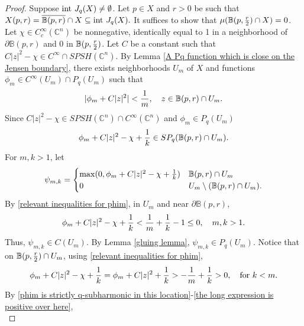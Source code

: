 \documentclass[12pt]{amsart}
\numberwithin{equation}{section}
{\theoremstyle{definition}
\newtheorem{remark}[theorem]{Remark}
}
\begin{document}
\begin{proof}
Suppose $\hbox{int } J_q(X) \neq \emptyset$. Let $p \in X$ and $r > 0$ be such that
$
X(p, r) = \overline{\mathbb{B}(p, r)} \cap X \subseteq \hbox{int } J_q(X).
$
It suffices to show that $\mu(\mathbb{B}(p, {r \over 2}) \cap X) = 0$.  Let $\chi \in C_c^{\infty}(\mathbb{C}^n)$ be nonnegative, identically equal to 1 in a neighborhood of $\partial \mathbb{B}(p, r)$ and 0 in $\mathbb{B}(p, {r \over 2})$.  Let $C$ be a constant such that $C|z|^2 - \chi \in C^{\infty} \cap SPSH(\mathbb{C}^n)$.  By Lemma \ref{A Pq function which is close on the Jensen boundary}, there exists neighborhoods $U_m$ of $X$ and functions $\phi_m \in C^{\infty}(U_m) \cap P_q(U_m)$ such that
\begin{equation}\label{relevant inequalities for phim}
    |\phi_m + C|z|^2| < {1 \over m}, \quad z \in \mathbb{B}(p, r) \cap U_m.
\end{equation}
Since $C|z|^2 - \chi \in SPSH(\mathbb{C}^n) \cap C^\infty(\mathbb{C}^n)$ and $\phi_m \in P_q(U_m)$ 
\begin{equation}\label{phim is strictly q-subharmonic in this location}
    \phi_m + C|z|^2 - \chi + {1 \over k} \in SP_q(\mathbb{B}(p, r) \cap U_m).
\end{equation}
For $m, k > 1$, let 
\begin{equation}\label{definition of psimk}
\psi_{m, k} = \begin{cases}
    \max(0, \phi_m + C|z|^2 - \chi + {1 \over k}) & \mathbb{B}(p, r) \cap U_m
    \\
    0 & U_m \setminus (\mathbb{B}(p, r) \cap U_m).
    \end{cases}
\end{equation}
By \eqref{relevant inequalities for phim}, in $U_m$ and near $\partial \mathbb{B}(p, r)$,
$$
\phi_m + C|z|^2 - \chi + {1 \over k} < {1 \over m} + {1 \over k} - 1 \leq 0, \quad m, k > 1.
$$
Thus, $\psi_{m, k} \in C(U_m)$.  By Lemma \ref{gluing lemma}, $\psi_{m, k} \in P_q(U_m)$.  Notice that on $\mathbb{B}(p, {r \over 2}) \cap U_m$, using \eqref{relevant inequalities for phim},
\begin{equation}\label{the long expression is positive over here}
    \phi_m + C|z|^2 - \chi + {1 \over k} = \phi_m + C|z|^2 + {1 \over k} > -{1 \over m} + {1 \over k} > 0, \quad \hbox{for $k < m$.}
\end{equation}
By \eqref{phim is strictly q-subharmonic in this location}-\eqref{the long expression is positive over here},
\begin{equation}\label{psimk is strictly q-subharmonic in this region which will allow the integral estimate to work}

\end{equation}
\end{proof}
\end{document}
